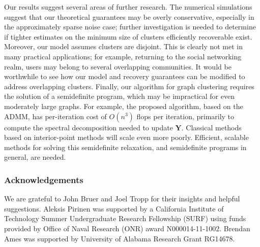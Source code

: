 \documentclass[twoside,11pt]{article}
\newcommand{\bs}{\boldsymbol}
\newcommand{\Y}{\bs {Y}}
\newcommand{\0}{\bs{0}}
\begin{document}
{Our results suggest several areas of further research.
The numerical simulations suggest that our theoretical guarantees may be overly conservative, especially in the approximately
sparse noise case;
further investigation is needed to determine if tighter estimates on the minimum size of clusters efficiently recoverable
exist.
Moreover, our model assumes clusters are disjoint. This is clearly not met in many practical applications; for example,
returning to the social networking realm,
users may belong to several overlapping communities.
It would be worthwhile to see how our model and recovery guarantees can be modified to address overlapping clusters.
Finally, our algorithm for graph clustering requires the solution of a semidefinite program, which may be impractical for
even moderately large graphs.
For example, the proposed algorithm, based on the ADMM, has per-iteration cost of $O(n^3)$ flops per iteration, primarily to compute the spectral decomposition needed to update $\Y$. Classical methods based on interior-point methods will scale even more poorly. Efficient, scalable methods for solving this semidefinite relaxation, and semidefinite programs in general, are needed.

\subsubsection*{Acknowledgements}
{We are grateful to John Bruer and Joel Tropp for their insights and helpful suggestions.
Aleksis Pirinen was supported by a California Institute of Technology Summer Undergraduate Research Fellowship (SURF) using funds provided by Office of Naval Research (ONR) award N000014-11-1002. Brendan Ames was supported by University of Alabama Research Grant RG14678.}
%
\appendix

}
\end{document}
